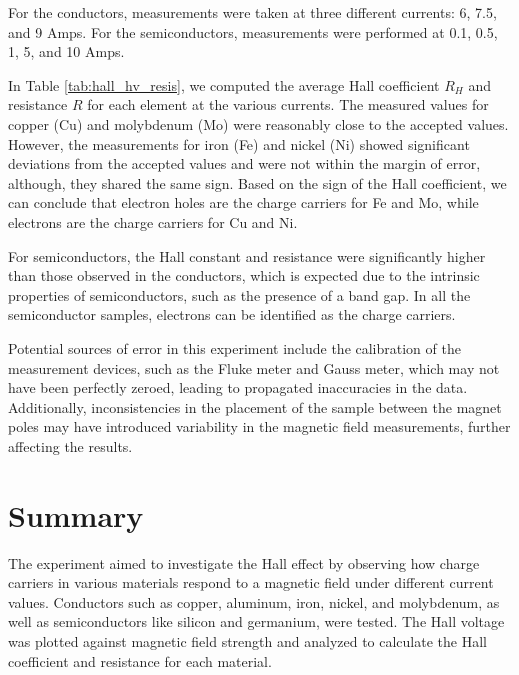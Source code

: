 \documentclass[a4paper,12pt,english]{all-in-one} %
\begin{document}
\begin{multicols}{2}
{For the conductors, measurements were taken at three different currents: 6, 7.5, and 9 Amps. For the semiconductors, measurements were performed at 0.1, 0.5, 1, 5, and 10 Amps.

In Table \ref{tab:hall_hv_resis}, we computed the average Hall coefficient $R_H$ and resistance $R$ for each element at the various currents. The measured values for copper (Cu) and molybdenum (Mo) were reasonably close to the accepted values. However, the measurements for iron (Fe) and nickel (Ni) showed significant deviations from the accepted values and were not within the margin of error, although, they shared the same sign. Based on the sign of the Hall coefficient, we can conclude that electron holes are the charge carriers for Fe and Mo, while electrons are the charge carriers for Cu and Ni.

For semiconductors, the Hall constant and resistance were significantly higher than those observed in the conductors, which is expected due to the intrinsic properties of semiconductors, such as the presence of a band gap. In all the semiconductor samples, electrons can be identified as the charge carriers.

Potential sources of error in this experiment include the calibration of the measurement devices, such as the Fluke meter and Gauss meter, which may not have been perfectly zeroed, leading to propagated inaccuracies in the data. Additionally, inconsistencies in the placement of the sample between the magnet poles may have introduced variability in the magnetic field measurements, further affecting the results.


}

\end{multicols}

\section*{Summary}
{
The experiment aimed to investigate the Hall effect by observing how charge carriers in various materials respond to a magnetic field under different current values. Conductors such as copper, aluminum, iron, nickel, and molybdenum, as well as semiconductors like silicon and germanium, were tested. The Hall voltage was plotted against magnetic field strength and analyzed to calculate the Hall coefficient and resistance for each material. 
}
\end{document}
